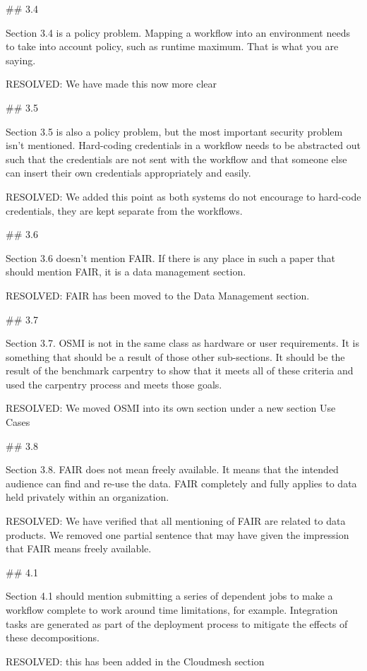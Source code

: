 ## 3.4

Section 3.4 is a policy problem. Mapping a workflow into an environment needs to take into account policy, such as runtime maximum. That is what you are saying.

    RESOLVED: We have made this now more clear

## 3.5

Section 3.5 is also a policy problem, but the most important security problem isn't mentioned. Hard-coding credentials in a workflow needs to be abstracted out such that the credentials are not sent with the workflow and that someone else can insert their own credentials appropriately and easily.

    RESOLVED: We added this point as both systems do not encourage to hard-code credentials, they are kept separate from the workflows.

## 3.6

Section 3.6 doesn't mention FAIR. If there is any place in such a paper that should mention FAIR, it is a data management section.

    RESOLVED: FAIR has been moved to the Data Management section. 

## 3.7

Section 3.7. OSMI is not in the same class as hardware or user requirements. It is something that should be a result of those other sub-sections. It should be the result of the benchmark carpentry to show that it meets all of these criteria and used the carpentry process and meets those goals.

    RESOLVED: We moved OSMI into its own section under a new section Use Cases

## 3.8

Section 3.8. FAIR does not mean freely available. It means that the intended audience can find and re-use the data. FAIR completely and fully applies to data held privately within an organization.

    RESOLVED: We have verified that all mentioning of FAIR are related to data products. We removed one partial sentence that may have given the impression that FAIR means freely available.

## 4.1

Section 4.1 should mention submitting a series of dependent jobs to make a workflow complete to work around time limitations, for example. Integration tasks are generated as part of the deployment process to mitigate the effects of these decompositions.

    RESOLVED: this has been added in the Cloudmesh section 

